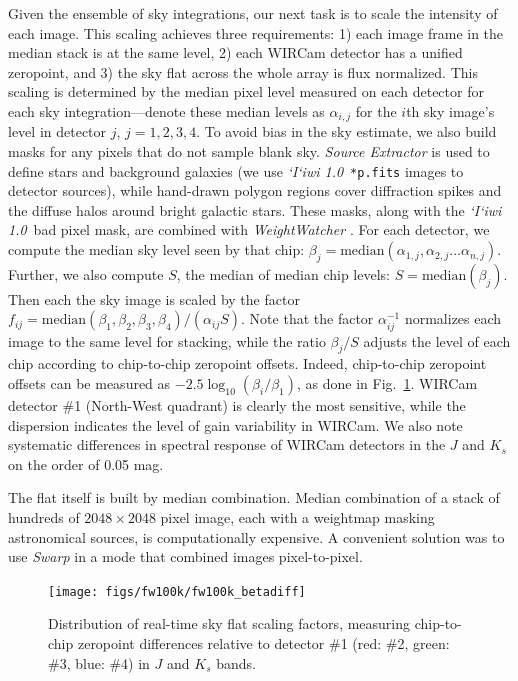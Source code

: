 \documentclass[iop]{emulateapj}
\newcommand{\sw}[1]{\textit{#1}} %
\newcommand{\iiwione}{\sw{`I`iwi 1.0}}
\newcommand{\Fig}[1]{Fig.~\ref{fig:#1}}  %
\begin{document}
Given the ensemble of sky integrations, our next task is to scale the intensity of each image.
This scaling achieves three requirements: 1) each image frame in the median stack is at the same level, 2) each WIRCam detector has a unified zeropoint, and 3) the sky flat across the whole array is flux normalized.
This scaling is determined by the median pixel level measured on each detector for each sky integration---denote these median levels as $\alpha_{i,j}$ for the $i$th sky image's level in detector $j$, $j=1, 2, 3, 4$.
To avoid bias in the sky estimate, we also build masks for any pixels that do not sample blank sky.
\sw{Source Extractor} \citep{Bertin:1996} is used to define stars and background galaxies (we use \iiwione\ \texttt{*p.fits} images to detector sources), while hand-drawn polygon regions cover diffraction spikes and the diffuse halos around bright galactic stars. These masks, along with the \iiwione\ bad pixel mask, are combined with \sw{WeightWatcher} \citep{Marmo:2008}.
For each detector, we compute the median sky level seen by that chip: $\beta_j = \mathrm{median}(\alpha_{1,j}, \alpha_{2,j}\ldots \alpha_{n,j} )$.
Further, we also compute $S$, the median of median chip levels: $S=\mathrm{median}(\beta_j)$.
Then each the sky image is scaled by the factor $f_{ij} = \mathrm{median}(\beta_1, \beta_2, \beta_3, \beta_4) / (\alpha_{ij} S)$.
Note that the factor $\alpha_{ij}^{-1}$ normalizes each image to the same level for stacking, while the ratio $\beta_j / S$ adjusts the level of each chip according to chip-to-chip zeropoint offsets.
Indeed, chip-to-chip zeropoint offsets can be measured as $-2.5 \log_{10}(\beta_i / \beta_1)$, as done in \Fig{fw100k_zpdiff}.
WIRCam detector \#1 (North-West quadrant) is clearly the most sensitive, while the dispersion indicates the level of gain variability in WIRCam.
We also note systematic differences in spectral response of WIRCam detectors in the $J$ and $K_s$ on the order of 0.05 mag.

The flat itself is built by median combination.
Median combination of a stack of hundreds of $2048\times2048$ pixel image, each with a weightmap masking astronomical sources, is computationally expensive.
A convenient solution was to use \sw{Swarp} \citep[an image-mosaicing software package,][]{Bertin:2002} in a mode that combined images pixel-to-pixel.

\begin{figure}[t]
\centering
\texttt{[image: figs/fw100k/fw100k\_betadiff]}
\caption{Distribution of real-time sky flat scaling factors, measuring chip-to-chip zeropoint differences relative to detector \#1 (red: \#2, green: \#3, blue: \#4) in $J$ and $K_s$ bands.
}
\label{fig:fw100k_zpdiff}
\end{figure}
\end{document}

